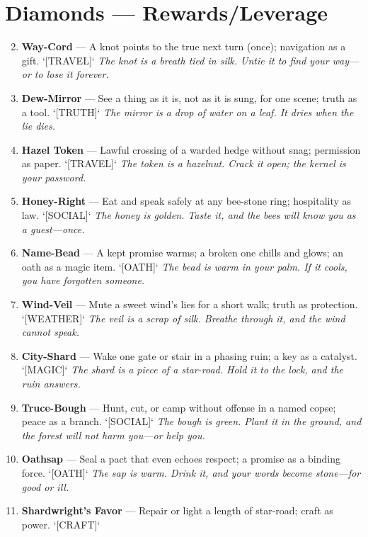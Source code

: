 \section*{Diamonds --- Rewards/Leverage}
\label{sec:valewood-rewards}
\begin{enumerate}
\setcounter{enumi}{1}
\item \textbf{Way-Cord} --- A knot points to the true next turn (once); navigation as a gift. `[TRAVEL]`
  \hfill \textit{The knot is a breath tied in silk. Untie it to find your way---or to lose it forever.}
\item \textbf{Dew-Mirror} --- See a thing as it is, not as it is sung, for one scene; truth as a tool. `[TRUTH]`
  \hfill \textit{The mirror is a drop of water on a leaf. It dries when the lie dies.}
\item \textbf{Hazel Token} --- Lawful crossing of a warded hedge without snag; permission as paper. `[TRAVEL]`
  \hfill \textit{The token is a hazelnut. Crack it open; the kernel is your password.}
\item \textbf{Honey-Right} --- Eat and speak safely at any bee-stone ring; hospitality as law. `[SOCIAL]`
  \hfill \textit{The honey is golden. Taste it, and the bees will know you as a guest---once.}
\item \textbf{Name-Bead} --- A kept promise warms; a broken one chills and glows; an oath as a magic item. `[OATH]`
  \hfill \textit{The bead is warm in your palm. If it cools, you have forgotten someone.}
\item \textbf{Wind-Veil} --- Mute a sweet wind's lies for a short walk; truth as protection. `[WEATHER]`
  \hfill \textit{The veil is a scrap of silk. Breathe through it, and the wind cannot speak.}
\item \textbf{City-Shard} --- Wake one gate or stair in a phasing ruin; a key as a catalyst. `[MAGIC]`
  \hfill \textit{The shard is a piece of a star-road. Hold it to the lock, and the ruin answers.}
\item \textbf{Truce-Bough} --- Hunt, cut, or camp without offense in a named copse; peace as a branch. `[SOCIAL]`
  \hfill \textit{The bough is green. Plant it in the ground, and the forest will not harm you---or help you.}
\item \textbf{Oathsap} --- Seal a pact that even echoes respect; a promise as a binding force. `[OATH]`
  \hfill \textit{The sap is warm. Drink it, and your words become stone---for good or ill.}
\item[J] \textbf{Shardwright's Favor} --- Repair or light a length of star-road; craft as power. `[CRAFT]`

\end{enumerate}
